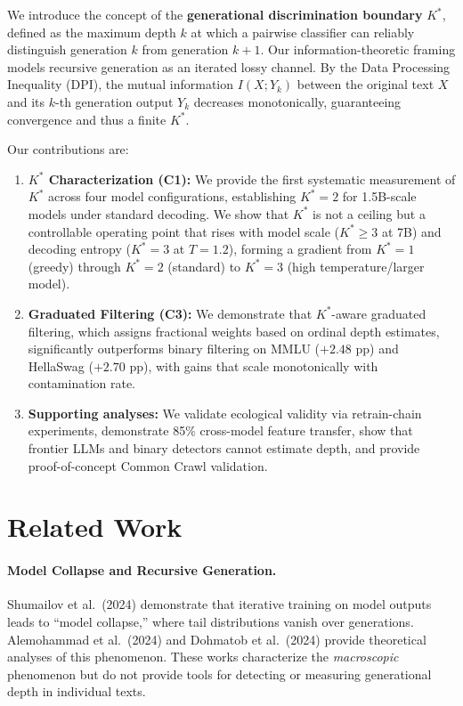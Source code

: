 \documentclass[11pt,a4paper]{article}
\begin{document}
We introduce the concept of the \textbf{generational discrimination boundary} $K^*$, defined as the maximum depth $k$ at which a pairwise classifier can reliably distinguish generation $k$ from generation $k+1$.
Our information-theoretic framing models recursive generation as an iterated lossy channel.
By the Data Processing Inequality (DPI), the mutual information $I(X; Y_k)$ between the original text $X$ and its $k$-th generation output $Y_k$ decreases monotonically, guaranteeing convergence and thus a finite $K^*$.

Our contributions are:
\begin{enumerate}
\item \textbf{$K^*$ Characterization (C1):} We provide the first systematic measurement of $K^*$ across four model configurations, establishing $K^*=2$ for 1.5B-scale models under standard decoding.
    We show that $K^*$ is not a ceiling but a controllable operating point that rises with model scale ($K^*\geq 3$ at 7B) and decoding entropy ($K^*=3$ at $T=1.2$), forming a gradient from $K^*=1$ (greedy) through $K^*=2$ (standard) to $K^*=3$ (high temperature/larger model).
\item \textbf{Graduated Filtering (C3):} We demonstrate that $K^*$-aware graduated filtering, which assigns fractional weights based on ordinal depth estimates, significantly outperforms binary filtering on MMLU ($+2.48$ pp) and HellaSwag ($+2.70$ pp), with gains that scale monotonically with contamination rate.
\item \textbf{Supporting analyses:} We validate ecological validity via retrain-chain experiments, demonstrate 85\% cross-model feature transfer, show that frontier LLMs and binary detectors cannot estimate depth, and provide proof-of-concept Common Crawl validation.
\end{enumerate}

\section{Related Work}

\paragraph{Model Collapse and Recursive Generation.}
Shumailov et al.\ (2024) demonstrate that iterative training on model outputs leads to ``model collapse,'' where tail distributions vanish over generations.
Alemohammad et al.\ (2024) and Dohmatob et al.\ (2024) provide theoretical analyses of this phenomenon.
These works characterize the \emph{macroscopic} phenomenon but do not provide tools for detecting or measuring generational depth in individual texts.
\end{document}
